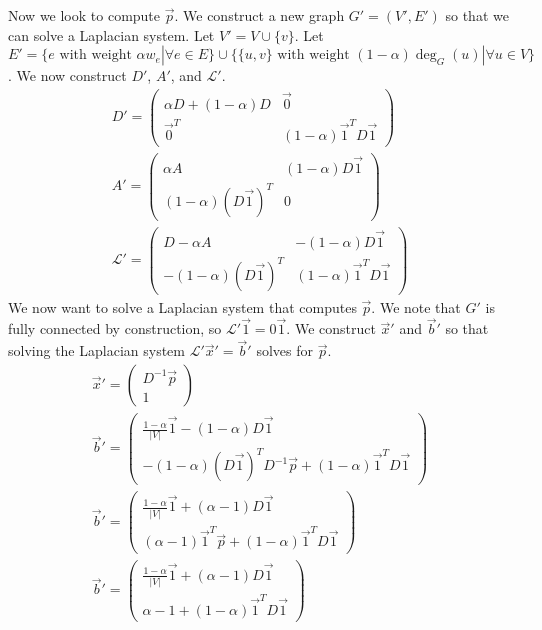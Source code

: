 \documentclass[12pt,a4paper]{article}
\begin{document}
	Now we look to compute $\vec{p}$. We construct a new graph $G' = (V', E')$ so that we can solve a Laplacian system. Let $V' = V \cup \{ v \}$.
	Let $E' = \{ e \text{ with weight } \alpha w_e | \forall e \in E \} \cup \{ \{u,v \} \text{ with weight } (1 - \alpha) \deg_G(u) | \forall u \in V \}$. We now construct $D'$, $A'$, and $\mathcal{L}'$.
	\begin{gather*}
		D' = 
		\begin{pmatrix}
		\alpha D + (1 - \alpha) D & \vec{0}\\
		\vec{0}^T & (1-\alpha) \vec{1}^T D \vec{1}
		\end{pmatrix}\\
		A' = 
		\begin{pmatrix}
		\alpha A & (1-\alpha) D \vec{1}\\
		(1-\alpha) (D \vec{1})^T & 0
		\end{pmatrix}\\
		\mathcal{L}' = 
		\begin{pmatrix}
		D - \alpha A & -(1-\alpha) D \vec{1}\\
		-(1-\alpha) (D \vec{1})^T & (1-\alpha) \vec{1}^T D \vec{1}
		\end{pmatrix}
	\end{gather*}
	We now want to solve a Laplacian system that computes $\vec{p}$. We note that $G'$ is fully connected by construction, so $\mathcal{L}' \vec{1} = 0 \vec{1}$. We construct $\vec{x}'$ and $\vec{b}'$ so that solving the Laplacian system $\mathcal{L}' \vec{x}' = \vec{b}'$ solves for $\vec{p}$.
	\begin{gather*}
		\vec{x}' = 
		\begin{pmatrix}
		D^{-1}\vec{p}\\
		1
		\end{pmatrix}\\
		\vec{b}' = 
		\begin{pmatrix}
		\frac{1 - \alpha}{|V|} \vec{1} - (1-\alpha) D\vec{1}\\
		-(1-\alpha) (D \vec{1})^T D^{-1}\vec{p} + (1-\alpha) \vec{1}^T D \vec{1}
		\end{pmatrix}\\
		\vec{b}' = 
		\begin{pmatrix}
		\frac{1 - \alpha}{|V|} \vec{1} + (\alpha - 1) D\vec{1}\\
		(\alpha-1) \vec{1}^T \vec{p} + (1-\alpha) \vec{1}^T D \vec{1}
		\end{pmatrix}\\
		\vec{b}' = 
		\begin{pmatrix}
		\frac{1 - \alpha}{|V|} \vec{1} + (\alpha - 1) D\vec{1}\\
		\alpha-1 + (1-\alpha) \vec{1}^T D \vec{1}
		\end{pmatrix}
	\end{gather*}
\end{document}
